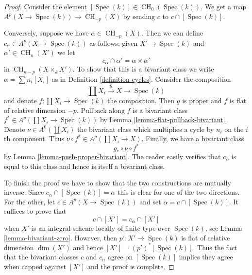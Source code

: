\documentclass[10pt,a4paper]{amsart}
\theoremstyle{plain}
\theoremstyle{definition}
\theoremstyle{remark}
\numberwithin{equation}{subsection}
\def\Spec{\mathop{\mathrm{Spec}}}
\def\CH{\mathop{\mathrm{CH}}\nolimits}
\begin{document}
\begin{proof}
Consider the element $[\Spec(k)] \in \CH_0(\Spec(k))$. We get a map
$A^p(X \to \Spec(k)) \to \CH_{-p}(X)$ by sending $c$ to $c \cap [\Spec(k)]$.

\medskip\noindent
Conversely, suppose we have $\alpha \in \CH_{-p}(X)$.
Then we can define $c_\alpha \in A^p(X \to \Spec(k))$ as
follows: given $X' \to \Spec(k)$ and $\alpha' \in \CH_n(X')$
we let
$$
c_\alpha \cap \alpha' = \alpha \times \alpha'
$$
in $\CH_{n - p}(X \times_k X')$. To show that this is a bivariant
class we write $\alpha = \sum n_i[X_i]$ as in
Definition \ref{definition-cycles}. Consider the composition
$$
\coprod X_i \xrightarrow{g} X \to \Spec(k)
$$
and denote $f : \coprod X_i \to \Spec(k)$ the composition.
Then $g$ is proper and $f$ is flat of relative dimension $-p$.
Pullback along $f$ is a bivariant class
$f^* \in A^p(\coprod X_i \to \Spec(k))$ by
Lemma \ref{lemma-flat-pullback-bivariant}.
Denote $\nu \in A^0(\coprod X_i)$ the bivariant class
which multiplies a cycle by $n_i$ on the $i$th component.
Thus $\nu \circ f^* \in A^p(\coprod X_i \to X)$.
Finally, we have a bivariant class
$$
g_* \circ \nu \circ f^*
$$
by Lemma \ref{lemma-push-proper-bivariant}. The reader easily
verifies that $c_\alpha$ is equal to this class and hence
is itself a bivariant class.

\medskip\noindent
To finish the proof we have to show that the two constructions
are mutually inverse. Since $c_\alpha \cap [\Spec(k)] = \alpha$
this is clear for one of the two directions. For the other, let
$c \in A^p(X \to \Spec(k))$ and set $\alpha = c \cap [\Spec(k)]$.
It suffices to prove that
$$
c \cap [X'] = c_\alpha \cap [X']
$$
when $X'$ is an integral scheme locally of finite type over $\Spec(k)$,
see Lemma \ref{lemma-bivariant-zero}. However, then $p' : X' \to \Spec(k)$
is flat of relative dimension $\dim(X')$ and hence
$[X'] = (p')^*[\Spec(k)]$. Thus the fact that the bivariant classes
$c$ and $c_\alpha$ agree on $[\Spec(k)]$ implies they
agree when capped against $[X']$ and the proof is complete.
\end{proof}
\end{document}
